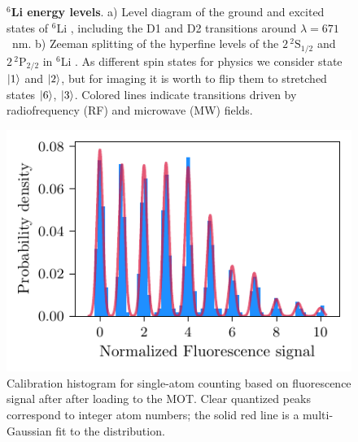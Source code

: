\begin{figure}
    \caption{
        \textbf{${}^6$Li energy levels}. 
        a) Level diagram of the ground and excited states of ${}^6$Li \cite{gehm_preparation_2003}, including the D1 and D2 transitions around $\lambda = 671$~nm. 
        b) Zeeman splitting of the hyperfine levels of the $2\, {}^2\mathrm{S}_{1/2}$ and $2\, {}^2\mathrm{P}_{2/2}$ in ${}^6$Li \cite{serwane_deterministic_2011, sibalic_arc_2017}. As different spin states for physics we consider state $\left| 1 \right\rangle$ and $\left| 2 \right\rangle$, but for imaging it is worth to flip them to stretched states $\left| 6 \right\rangle$, $\left| 3 \right\rangle$. Colored lines indicate transitions driven by radiofrequency (RF) and microwave (MW) fields.
    }
    \label{fig:li6levels}
\end{figure}




\begin{figure}
    \centering
    \includegraphics{fig-py/atom-counting.pdf}
    \caption{
        Calibration histogram for single-atom counting based on fluorescence signal after after loading to the MOT. Clear quantized peaks correspond to integer atom numbers; the solid red line is a multi-Gaussian fit to the distribution. 
    }
    \label{fig:spillingadd}
\end{figure}

